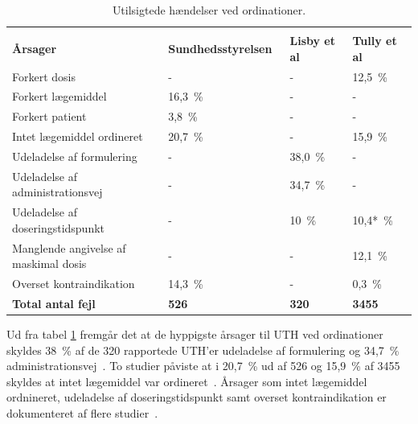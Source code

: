 	\vspace{2mm}
\begin{longtable}{p{5.5cm}|p{3cm}|p{2cm}|p{2.3cm}}
	\caption{Utilsigtede hændelser ved ordinationer.}
	\vspace{2mm}
	\label{table:UTHordination} \\
\cellcolor[HTML]{C0C0C0} {\textbf{Årsager}} & 
{\cellcolor[HTML]{C0C0C0}\textbf{Sundhedsstyrelsen~\citep{Sundhedsstyrelsen2005}}} &
{\cellcolor[HTML]{C0C0C0}\textbf{Lisby et al~\citep{Lisby2005}}} &
{\cellcolor[HTML]{C0C0C0}\textbf{Tully et al~\citep{Tully2009}}} \\ \hline
Forkert dosis & - & - & 12,5~\%  \\ \hline %
Forkert lægemiddel & 16,3~\% & - & - \\ \hline %
Forkert patient & 3,8~\% & - & - \\ \hline %
Intet lægemiddel ordineret & 20,7~\% & - & 15,9~\% \\ \hline %
Udeladelse af formulering & - & 38,0~\% & - \\ \hline %
Udeladelse af administrationsvej & - & 34,7~\% & - \\ \hline %
Udeladelse af doseringstidspunkt & - & 10~\% & 10,4*~\% \\ \hline %
Manglende angivelse af maskimal dosis & - & - & 12,1~\% \\ \hline %
Overset kontraindikation & 14,3~\% & - & 0,3~\% \\ \hline %
\cellcolor[HTML]{C0C0C0} {\textbf{Total antal fejl}} & 
{\cellcolor[HTML]{C0C0C0}\textbf{526}} &
{\cellcolor[HTML]{C0C0C0}\textbf{320}} &
{\cellcolor[HTML]{C0C0C0}\textbf{3455}}
\end{longtable}

Ud fra tabel \ref{table:UTHordination} fremgår det at de hyppigste årsager til UTH ved ordinationer skyldes 38~\% af de 320 rapportede UTH'er udeladelse af formulering og 34,7~\% administrationsvej~\citep{Lisby2005}. To studier påviste at i 20,7~\% ud af 526 og 15,9~\% af 3455 skyldes at intet lægemiddel var ordineret~\citep{Sundhedsstyrelsen2005, Tully2009}. Årsager som intet lægemiddel ordnineret, udeladelse af doseringstidspunkt samt overset kontraindikation er dokumenteret af flere studier~\citep{Sundhedsstyrelsen2005, Lisby2005, Tully2009}. 

